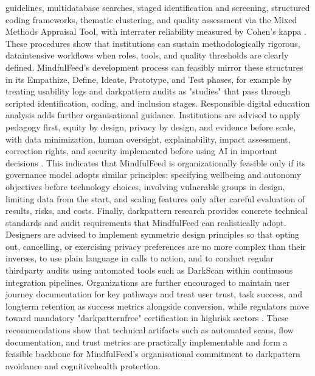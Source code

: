 \documentclass{article}
\begin{document}
guidelines, multi\-database searches, staged identification and screening, structured coding frameworks, thematic clustering, and quality assessment via the Mixed Methods Appraisal Tool, with inter\-rater reliability measured by Cohen's kappa \parencites[19]{8760542}. These procedures show that institutions can sustain methodologically rigorous, data\-intensive workflows when roles, tools, and quality thresholds are clearly defined. MindfulFeed's development process can feasibly mirror these structures in its Empathize, Define, Ideate, Prototype, and Test phases, for example by treating usability logs and dark\-pattern audits as "studies" that pass through scripted identification, coding, and inclusion stages. Responsible digital education analysis adds further organisational guidance. Institutions are advised to apply pedagogy first, equity by design, privacy by design, and evidence before scale, with data minimization, human oversight, explainability, impact assessment, correction rights, and security implemented before using AI in important decisions \parencites[15]{5375614}. This indicates that MindfulFeed is organizationally feasible only if its governance model adopts similar principles: specifying well\-being and autonomy objectives before technology choices, involving vulnerable groups in design, limiting data from the start, and scaling features only after careful evaluation of results, risks, and costs. Finally, dark\-pattern research provides concrete technical standards and audit requirements that MindfulFeed can realistically adopt. Designers are advised to implement symmetric design principles so that opting out, cancelling, or exercising privacy preferences are no more complex than their inverses, to use plain language in calls to action, and to conduct regular third\-party audits using automated tools such as DarkScan within continuous integration pipelines. Organizations are further encouraged to maintain user journey documentation for key pathways and treat user trust, task success, and long\-term retention as success metrics alongside conversion, while regulators move toward mandatory "dark\-pattern\-free" certification in high\-risk sectors \parencites[8]{4807303}. These recommendations show that technical artifacts such as automated scans, flow documentation, and trust metrics are practically implementable and form a feasible backbone for MindfulFeed's organisational commitment to dark\-pattern avoidance and cognitive\-health protection.
\end{document}
